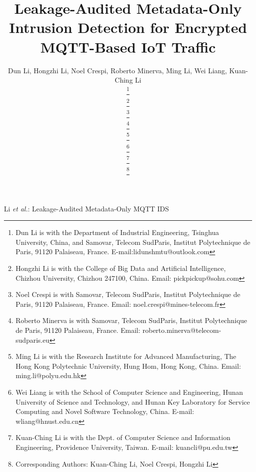 \documentclass[lettersize,journal]{IEEEtran}
\begin{document}
\title{Leakage-Audited Metadata-Only Intrusion Detection for Encrypted MQTT-Based IoT Traffic}

\author{
Dun Li\orcidA{},
Hongzhi Li\orcidH{},
Noel Crespi\orcidN{},
Roberto Minerva\orcidR{},
Ming Li\orcidM{},
Wei Liang\orcidW{},
Kuan-Ching Li\orcidK{}

\thanks{
Dun Li is with the Department of Industrial Engineering, Tsinghua University, China, and Samovar, Telecom SudParis, Institut Polytechnique de Paris, 91120 Palaiseau, France. E-mail:lidunshmtu@outlook.com
}

\thanks{
Hongzhi Li is with the College of Big Data and Artificial Intelligence, Chizhou University, Chizhou 247100, China. Email: pickpickup@sohu.com
}

\thanks{
Noel Crespi is with Samovar, Telecom SudParis, Institut Polytechnique de Paris, 91120 Palaiseau, France. Email: noel.crespi@mines-telecom.fr
}

\thanks{
Roberto Minerva is with Samovar, Telecom SudParis, Institut Polytechnique de Paris, 91120 Palaiseau, France. Email: roberto.minerva@telecom-sudparis.eu
}

\thanks{
Ming Li is with the Research Institute for Advanced Manufacturing, The Hong Kong Polytechnic University, Hung Hom, Hong Kong, China. Email: ming.li@polyu.edu.hk
}

\thanks{
Wei Liang is with the School of Computer Science and Engineering, Hunan University of Science and Technology, and Hunan Key Laboratory for Service Computing and Novel Software Technology, China. E-mail: wliang@hnust.edu.cn
}

\thanks{
Kuan-Ching Li is with the Dept. of Computer Science and Information Engineering, Providence University, Taiwan. E-mail: kuancli@pu.edu.tw}

\thanks{
Corresponding Authors: Kuan-Ching Li, Noel Crespi, Hongzhi Li}
}

%
{Li \MakeLowercase{\textit{et al.}}: Leakage-Audited Metadata-Only MQTT IDS}

\maketitle
\end{document}
